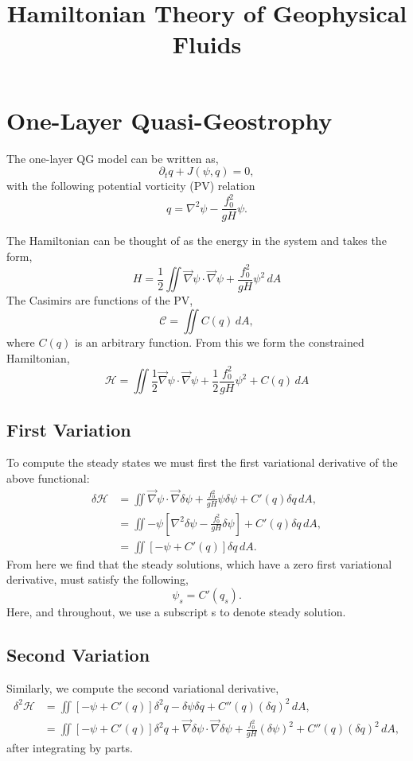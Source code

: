 \documentclass[12pt]{article}
\begin{document}
\title{Hamiltonian Theory of Geophysical Fluids}

\section{One-Layer Quasi-Geostrophy}

The one-layer QG model can be written as,
$$
\partial_t q + J(\psi, q) = 0,
$$
with the following potential vorticity (PV) relation
$$
q = \nabla^2 \psi - \frac{f_0^2}{gH} \psi.
$$

The Hamiltonian can be thought of as the energy in the system and takes the form,
$$
H =  \frac12 \iint \vec\nabla\psi \cdot \vec\nabla\psi + \frac{f_0^2}{g H} \psi^2 \, dA
$$
The Casimirs are functions of the PV,
$$
\mathcal{C} = \iint C(q) \, dA,
$$
where $C(q)$ is an arbitrary function. From this we form the constrained Hamiltonian,
\begin{equation}
\mathcal{H} = \iint  \frac12 \vec\nabla\psi \cdot \vec\nabla\psi + \frac12 \frac{f_0^2}{g H} \psi^2 + C(q) \, dA
\label{eqn:qg_ol_h}
\end{equation}

\subsection{First Variation}
To compute the steady states we must first the first variational derivative of the above functional:
\begin{align*}
\delta \mathcal{H} 
& = \iint \vec\nabla\psi \cdot \vec\nabla \delta \psi + \frac{f_0^2}{g H} \psi \delta \psi + C'(q) \delta q \, dA, \\
& = \iint -\psi \left[ \nabla^2 \delta \psi - \frac{f_0^2}{g H} \delta \psi \right]  + C'(q) \delta q \, dA, \\
& = \iint \left[ - \psi + C'(q) \right]  \delta q  \, dA.
\end{align*}
From here we find that the steady solutions, which have a zero first variational derivative, must satisfy the following,
$$
\psi_s = C'(q_s).
$$
Here, and throughout, we use a subscript s to denote steady solution.

\subsection{Second Variation}
Similarly, we compute the second variational derivative,
\begin{align*}
\delta^2 \mathcal{H} 
& = \iint \left[ - \psi + C'(q) \right]  \delta^2 q  - \delta \psi \delta q +  C''(q) (\delta q)^2  \, dA, \\
& = \iint \left[ - \psi + C'(q) \right]  \delta^2 q   
+ \vec\nabla \delta \psi \cdot \vec \nabla \delta \psi 
+\frac{f_0^2}{gH} (\delta \psi)^2+  C''(q) (\delta q)^2  \, dA, 
\end{align*}
after integrating by parts.
\end{document}

